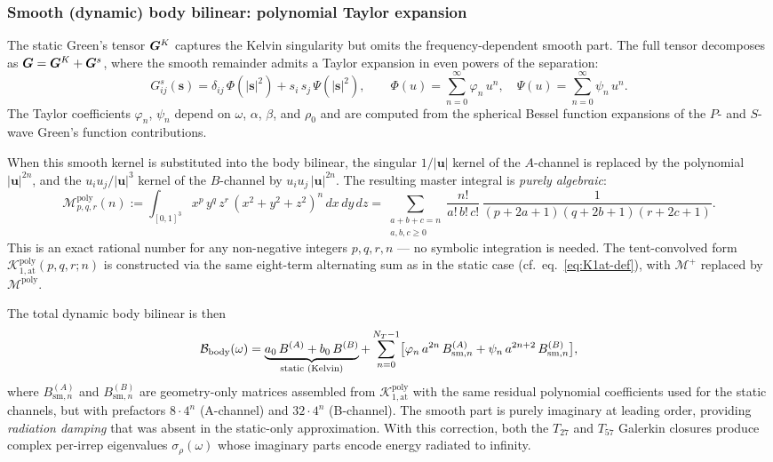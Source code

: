 \subsubsection*{Smooth (dynamic) body bilinear: polynomial Taylor
expansion}

The static Green's tensor $\bm{G}^K$ captures the Kelvin singularity but
omits the frequency-dependent smooth part.  The full tensor decomposes
as $\bm{G} = \bm{G}^K + \bm{G}^s$, where the smooth remainder admits a Taylor
expansion in even powers of the separation:
\begin{equation}
  G^s_{ij}(\bm{s})
  = \delta_{ij}\,\Phi(|\bm{s}|^2)
  + s_i\,s_j\,\Psi(|\bm{s}|^2),
  \qquad
  \Phi(u) = \sum_{n=0}^\infty \varphi_n\,u^n,
  \quad
  \Psi(u) = \sum_{n=0}^\infty \psi_n\,u^n.
  \label{eq:green-smooth}
\end{equation}
The Taylor coefficients $\varphi_n$, $\psi_n$ depend on $\omega$,
$\alpha$, $\beta$, and $\rho_0$ and are computed from the spherical
Bessel function expansions of the $P$- and $S$-wave Green's function
contributions.

When this smooth kernel is substituted into the body bilinear, the
singular $1/|\bm{u}|$ kernel of the $A$-channel is replaced by the
polynomial $|\bm{u}|^{2n}$, and the $u_i u_j/|\bm{u}|^3$ kernel of
the $B$-channel by $u_i u_j\,|\bm{u}|^{2n}$.  The resulting master
integral is \emph{purely algebraic}:
\begin{equation}
  \mathcal{M}^{\mathrm{poly}}_{p,q,r}(n)
  := \int_{[0,1]^3}\!x^p\,y^q\,z^r\,(x^2{+}y^2{+}z^2)^n\,dx\,dy\,dz
  = \sum_{\substack{a+b+c=n \\ a,b,c \ge 0}}
    \frac{n!}{a!\,b!\,c!}\,
    \frac{1}{(p{+}2a{+}1)(q{+}2b{+}1)(r{+}2c{+}1)}.
  \label{eq:mp-poly}
\end{equation}
This is an exact rational number for any non-negative integers $p,q,r,n$
--- no symbolic integration is needed.  The tent-convolved form
$\mathcal{K}^{\mathrm{poly}}_{1,\mathrm{at}}(p,q,r;n)$ is constructed via
the same eight-term alternating sum as in the static case (cf.\
eq.~\eqref{eq:K1at-def}), with $\mathcal{M}^+$ replaced by
$\mathcal{M}^{\mathrm{poly}}$.

The total dynamic body bilinear is then
\begin{equation}
  \mathcal{B}_{\mathrm{body}}(\omega)
  = \underbrace{a_0\,B^{(A)} + b_0\,B^{(B)}}_{%
      \text{static (Kelvin)}}
  + \sum_{n=0}^{N_T-1}
    \bigl[\varphi_n\,a^{2n}\,B^{(A)}_{\mathrm{sm},n}
         + \psi_n\,a^{2n+2}\,B^{(B)}_{\mathrm{sm},n}\bigr],
  \label{eq:bbody-dynamic}
\end{equation}
where $B^{(A)}_{\mathrm{sm},n}$ and $B^{(B)}_{\mathrm{sm},n}$ are
geometry-only matrices assembled from
$\mathcal{K}^{\mathrm{poly}}_{1,\mathrm{at}}$ with the same
residual polynomial coefficients used for the static channels, but
with prefactors $8\cdot4^n$ (A-channel) and $32\cdot4^n$ (B-channel).
The smooth part is purely imaginary at leading order, providing
\emph{radiation damping} that was absent in the static-only
approximation.  With this correction, both the $T_{27}$ and $T_{57}$
Galerkin closures produce complex per-irrep eigenvalues
$\sigma_\rho(\omega)$ whose imaginary parts encode energy radiated
to infinity.

